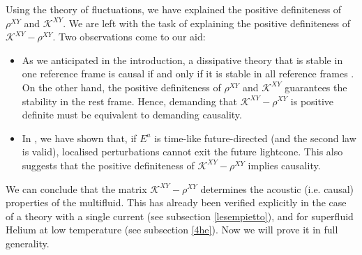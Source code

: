 \documentclass[a4paper, amsfonts, amssymb, amsmath, reprint, showkeys, nofootinbib, twoside, onecolumn,notitlepage]{revtex4-1}
\theoremstyle{definition}
\theoremstyle{theorem}
\begin{document}
Using the theory of fluctuations, we have explained the positive definiteness of $\rho^{XY}$ and $\mathcal{K}^{XY}$. We are left with the task of explaining the positive definiteness of $\mathcal{K}^{XY}-\rho^{XY}$. Two observations come to our aid:
\begin{itemize}
\item As we anticipated in the introduction, a dissipative theory that is stable in one reference frame is causal if and only if it is stable in all reference frames \cite{GavassinoSuperluminal2021}. On the other hand, the positive definiteness of $\rho^{XY}$ and $\mathcal{K}^{XY}$ guarantees the stability in the rest frame. Hence, demanding that $\mathcal{K}^{XY}-\rho^{XY}$ is positive definite must be equivalent to demanding causality.
\item In \cite{GavassinoCausality2021}, we have shown that, if $E^a$ is time-like future-directed (and the second law is valid), localised perturbations cannot exit the future lightcone. This also suggests that the positive definiteness of $\mathcal{K}^{XY}-\rho^{XY}$ implies causality.
\end{itemize} 
We can conclude that the matrix $\mathcal{K}^{XY}-\rho^{XY}$ determines the acoustic (i.e. causal) properties of the multifluid. This has already been verified explicitly in the case of a theory with a single current (see subsection \ref{lesempietto}), and for superfluid Helium at low temperature (see subsection \ref{4he}). Now we will prove it in full generality. 
\end{document}
